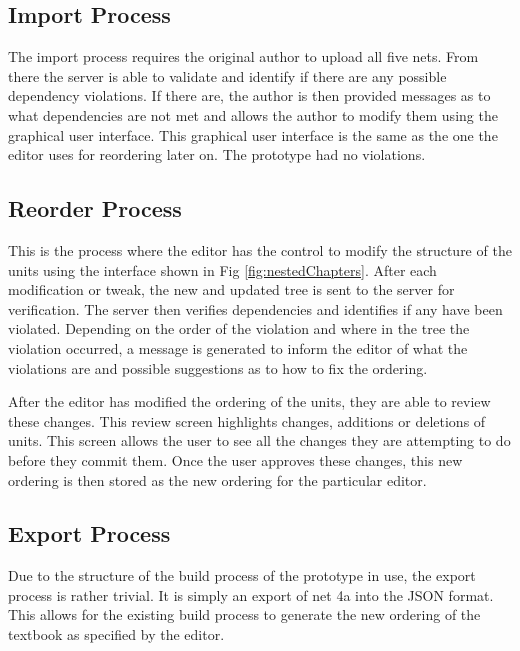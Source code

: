 \subsection{Import Process}

The import process requires the original author to upload all five nets. From there the server is able to validate and identify if there are any possible dependency violations. If there are, the author is then provided messages as to what dependencies are not met and allows the author to modify them using the graphical user interface. This graphical user interface is the same as the one the editor uses for reordering later on. The prototype had no violations.

\subsection{Reorder Process}

This is the process where the editor has the control to modify the structure of the units using the interface shown in Fig \ref{fig:nestedChapters}. After each modification or tweak, the new and updated tree is sent to the server for verification. The server then verifies dependencies and identifies if any have been violated. Depending on the order of the violation and where in the tree the violation occurred, a message is generated to inform the editor of what the violations are and possible suggestions as to how to fix the ordering.

After the editor has modified the ordering of the units, they are able to review these changes. This review screen highlights changes, additions or deletions of units. This screen allows the user to see all the changes they are attempting to do before they commit them. Once the user approves these changes, this new ordering is then stored as the new ordering for the particular editor.

\subsection{Export Process}

Due to the structure of the build process of the prototype in use, the export process is rather trivial. It is simply an export of net 4a into the JSON format. This allows for the existing build process to generate the new ordering of the textbook as specified by the editor.
